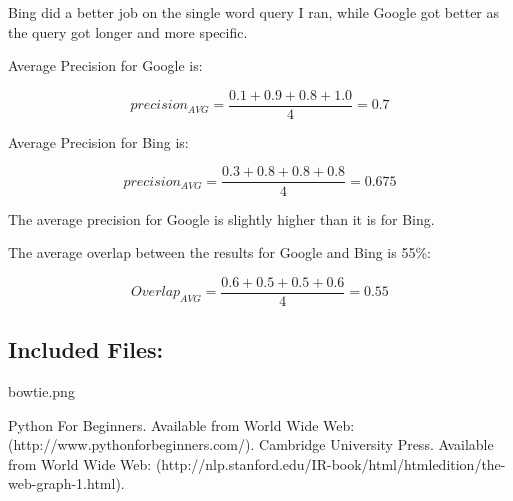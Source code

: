 \documentclass[a4paper, 11pt]{article}
\begin{document}
Bing did a better job on the single word query I ran, while Google got better as the query got longer and more specific.

Average Precision for Google is:

$$ 
precision_{AVG} = \frac{0.1 + 0.9 + 0.8 + 1.0}{4} = 0.7
$$


Average Precision for Bing is:

$$ 
precision_{AVG} = \frac{0.3 + 0.8 + 0.8 + 0.8}{4} = 0.675
$$

The average precision for Google is slightly higher than it is for Bing.

The average overlap between the results for Google and Bing is 55\%:

$$ 
Overlap_{AVG} = \frac{0.6 + 0.5 + 0.5 + 0.6}{4} = 0.55
$$
 
\subsection*{Included Files:}
bowtie.png

\begin{thebibliography}{9}
 Python For Beginners. Available from World Wide Web:(http://www.pythonforbeginners.com/).
 Cambridge University Press. Available from World Wide Web: (http://nlp.stanford.edu/IR-book/html/htmledition/the-web-graph-1.html).
\end{thebibliography}
\end{document}
